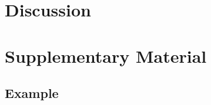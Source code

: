 \documentclass{article}
\begin{document}
\section{Discussion}
\label{subsection:discussion}




\section{Supplementary Material}
\label{section:supplementary-material}

\subsection{Example}
\label{subsection:supplement-example}
\end{document}
